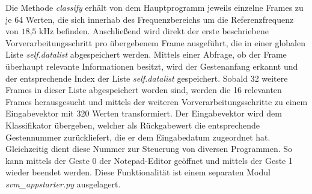 Die Methode \textit{classify} erhält von dem Hauptprogramm jeweils einzelne Frames zu je 64 Werten, die sich innerhab des Frequenzbereichs um die Referenzfrequenz von $18\text{,}5\text{ kHz}$ befinden.
Anschließend wird direkt der erste beschriebene Vorverarbeitungsschritt pro übergebenem Frame ausgeführt, die in einer globalen Liste \textit{self.datalist} abgespeichert werden.
Mittels einer Abfrage, ob der Frame überhaupt relevante Informationen besitzt, wird der Gestenanfang erkannt und der entsprechende Index der Liste \textit{self.datalist} gespeichert.
Sobald 32 weitere Frames in dieser Liste abgespeichert worden sind, werden die 16 relevanten Frames herausgesucht und mittels der weiteren Vorverarbeitungsschritte zu einem Eingabevektor mit 320 Werten transformiert.
Der Eingabevektor wird dem Klassifikator übergeben, welcher als Rückgabewert die entsprechende Gestennummer zurückliefert, die er dem Eingabedatum zugeordnet hat.
Gleichzeitig dient diese Nummer zur Steuerung von diversen Programmen.
So kann mittels der Geste 0 der Notepad-Editor geöffnet und mittels der Geste 1 wieder beendet werden.
Diese Funktionalität ist einem separaten Modul \textit{svm_appstarter.py} ausgelagert.

